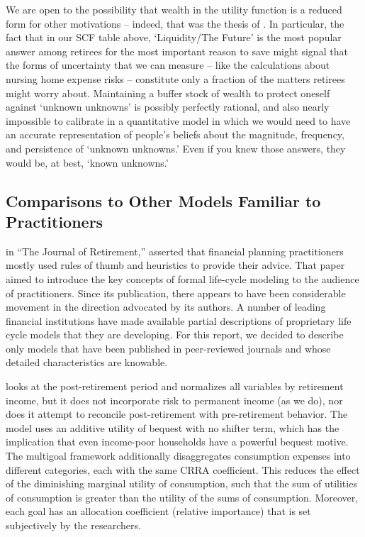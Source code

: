 \documentclass{article}
\begin{document}
We are open to the possibility that wealth in the utility function is a reduced form for other motivations -- indeed, that was the thesis of \cite{WhyDoTheRich}.
In particular, the fact that in our SCF table above, `Liquidity/The Future' is the most popular answer among retirees for the most important reason to save might signal that the forms of uncertainty that we can measure -- like the \cite{Ameriks2020jpe} calculations about nursing home expense risks -- constitute only a fraction of the matters retirees might worry about.
Maintaining a buffer stock of wealth to protect oneself against `unknown unknowns' is possibly perfectly rational, and also nearly impossible to calibrate in a quantitative model in which we would need to have an accurate representation of people's beliefs about the magnitude, frequency, and persistence of `unknown unknowns.'
Even if you knew those answers, they would be, at best, `known unknowns.'

\subsection{Comparisons to Other Models Familiar to Practitioners}

\cite{Gordon_2014} in ``The Journal of Retirement,'' asserted that financial planning practitioners mostly used rules of thumb and heuristics to provide their advice.
That paper aimed to introduce the key concepts of formal life-cycle modeling to the audience of practitioners.
Since its publication, there appears to have been considerable movement in the direction advocated by its authors.
A number of leading financial institutions have made available partial descriptions of proprietary life cycle models that they are developing.
For this report, we decided to describe only models that have been published in peer-reviewed journals and whose detailed characteristics are knowable.

\cite{Daga_2023} looks at the post-retirement period and normalizes all variables by retirement income, but it does not incorporate risk to permanent income (as we do), nor does it attempt to reconcile post-retirement with pre-retirement behavior.
The model uses an additive utility of bequest with no shifter term, which has the implication that even income-poor households have a powerful bequest motive.
The multigoal framework additionally disaggregates consumption expenses into different categories, each with the same CRRA coefficient.
This reduces the effect of the diminishing marginal utility of consumption, such that the sum of utilities of consumption is greater than the utility of the sums of consumption.
Moreover, each goal has an allocation coefficient (relative importance) that is set subjectively by the researchers.
\end{document}
